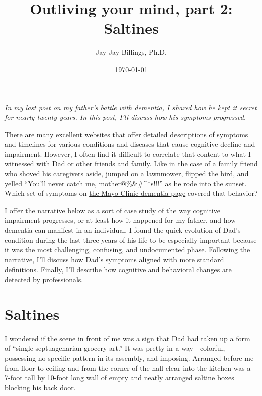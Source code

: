 \documentclass{article}
\title{Outliving your mind, part 2: Saltines}
\author{Jay Jay Billings, Ph.D.}
\date{\today}
\begin{document}
\maketitle

\textit{In my \href{https://jayjaybillings.com/2023/07/06/outliving-your-mind-part-1-the-secret/}{last post} on my father's battle with dementia, I shared how he kept it secret for nearly twenty years. In this post, I'll discuss how his symptoms progressed.}

There are many excellent websites that offer detailed descriptions of symptoms and timelines for various conditions and diseases that cause cognitive decline and impairment. However, I often find it difficult to correlate that content to what I witnessed with Dad or other friends and family. Like in the case of a family friend who shoved his caregivers aside, jumped on a lawnmower, flipped the bird, and yelled ``You'll never catch me, mother@\%\&\#\^\@*s!!!'' as he rode into the sunset. Which set of symptoms on \href{https://www.mayoclinic.org/diseases-conditions/dementia/symptoms-causes/syc-20352013}{the Mayo Clinic dementia page} covered that behavior?

I offer the narrative below as a sort of case study of the way cognitive impairment progresses, or at least how it happened for my father, and how dementia can manifest in an individual. I found the quick evolution of Dad's condition during the last three years of his life to be especially important because it was the most challenging, confusing, and undocumented phase. Following the narrative, I'll discuss how Dad's symptoms aligned with more standard definitions. Finally, I'll describe how cognitive and behavioral changes are detected by professionals.

\section*{Saltines}

I wondered if the scene in front of me was a sign that Dad had taken up a form of ``single septuagenarian grocery art.'' It was pretty in a way - colorful, possessing no specific pattern in its assembly, and imposing. Arranged before me from floor to ceiling and from the corner of the hall clear into the kitchen was a 7-foot tall by 10-foot long wall of empty and neatly arranged saltine boxes blocking his back door.
\end{document}
